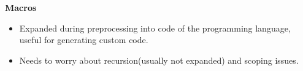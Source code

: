\begin{center}
     \textbf{Macros}
\end{center}
\begin{itemize}
    \item Expanded during preprocessing into code of the programming language, useful for generating custom code.
    \item Needs to worry about recursion(usually not expanded) and scoping issues.
\end{itemize}